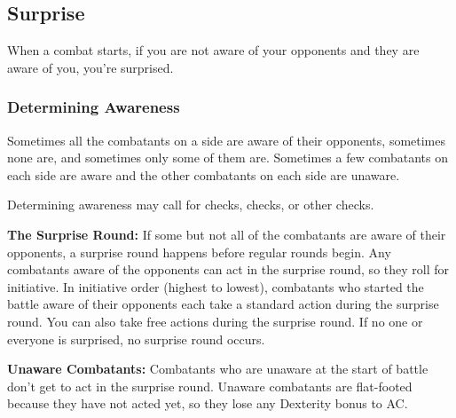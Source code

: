 \subsection{Surprise}
When a combat starts, if you are not aware of your opponents and they are aware of you, you're surprised.

\subsubsection{Determining Awareness}
Sometimes all the combatants on a side are aware of their opponents, sometimes none are, and sometimes only some of them are. Sometimes a few combatants on each side are aware and the other combatants on each side are unaware.

Determining awareness may call for  checks,  checks, or other checks.

\textbf{The Surprise Round:} If some but not all of the combatants are aware of their opponents, a surprise round happens before regular rounds begin. Any combatants aware of the opponents can act in the surprise round, so they roll for initiative. In initiative order (highest to lowest), combatants who started the battle aware of their opponents each take a standard action during the surprise round. You can also take free actions during the surprise round. If no one or everyone is surprised, no surprise round occurs.

\textbf{Unaware Combatants:} Combatants who are unaware at the start of battle don't get to act in the surprise round. Unaware combatants are flat-footed because they have not acted yet, so they lose any Dexterity bonus to AC.